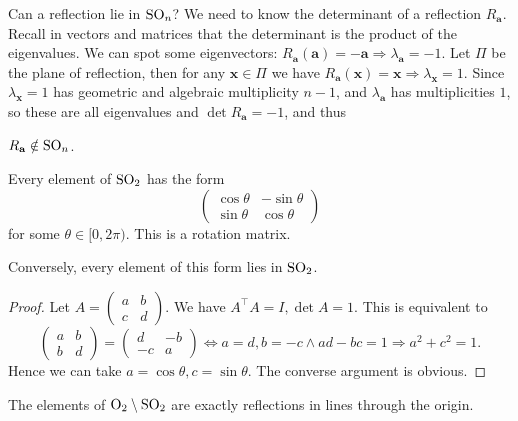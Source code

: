 \documentclass[a4paper]{article}
\begin{document}
    Can a reflection lie in $ \mathrm{SO}_n $? We need to know the determinant of a reflection $ R_\mathbf{a} $. Recall in vectors and matrices that the determinant is the product of the eigenvalues. We can spot some eigenvectors: $ R_\mathbf{a}(\mathbf{a})=-\mathbf{a} \Rightarrow \lambda_\mathbf{a}=-1 $. Let $ \Pi $ be the plane of reflection, then for any $ \mathbf{x}\in \Pi $ we have $ R_\mathbf{a}(\mathbf{x})=\mathbf{x} \Rightarrow \lambda_{\mathbf{x}}=1$. Since $ \lambda_\mathbf{x}=1 $ has geometric and algebraic multiplicity $n-1$, and $ \lambda_\mathbf{a} $ has multiplicities $1$, so these are all eigenvalues and $ \det R_\mathbf{a}=-1 $, and thus
    \begin{proposition}\label{prop:7.17}
        $R_\mathbf{a}\notin \mathrm{SO}_n$.
    \end{proposition}
    \begin{theorem}\label{thm:7.18}
        Every element of $\mathrm{SO}_2$ has the form 
        \[
            \begin{pmatrix}
                \cos \theta& -\sin \theta\\
                \sin \theta& \cos \theta
            \end{pmatrix}
        \]
        for some $ \theta\in [0,2\pi) $. This is a rotation matrix.

        Conversely, every element of this form lies in $\mathrm{SO}_2$.
    \end{theorem}
    \begin{proof}
        Let $A= \begin{pmatrix}
            a&b\\c&d
        \end{pmatrix} $.
        We have $ A^\top A=I, \det A=1 $. This is equivalent to 
        \[
            \begin{pmatrix}
                a&b\\b&d
            \end{pmatrix}=\begin{pmatrix}
                d&-b\\-c&a
            \end{pmatrix} \Longleftrightarrow a=d,b=-c \land ad-bc=1 \Longrightarrow a^2+c^2=1.
        \]
        Hence we can take $ a=\cos \theta, c=\sin \theta $. The converse argument is obvious.
    \end{proof}
    \begin{theorem}\label{thm:7.19}
        The elements of $ \mathrm{O}_2 \setminus \mathrm{SO}_2 $ are exactly reflections in lines through the origin.
    \end{theorem}
\end{document}
